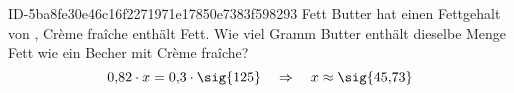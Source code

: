 \begin{exercise}
      {ID-5ba8fe30e46c16f2271971e17850e7383f598293}
      {Fett}
  \ifproblem\problem
    Butter hat einen Fettgehalt von , Crème fraîche enthält 
    Fett. Wie viel Gramm Butter enthält dieselbe Menge Fett wie ein Becher
    mit  Crème fraîche?
  \fi
  \ifoutcome\outcome
    \begin{equation*}
      0,\!82\cdot x=0,\!3\cdot\text{\sig{125}}
      \quad\Rightarrow\quad
      x\approx\text{\sig{45,73}}
    \end{equation*}
  \fi
\end{exercise}
